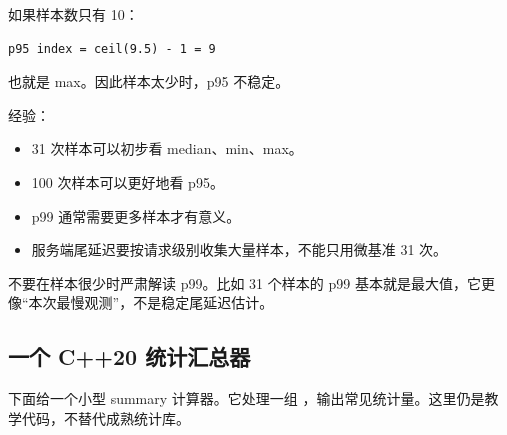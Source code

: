 如果样本数只有 10：

\begin{lstlisting}
p95 index = ceil(9.5) - 1 = 9
\end{lstlisting}

也就是 max。因此样本太少时，p95 不稳定。

经验：

\begin{itemize}
  \item 31 次样本可以初步看 median、min、max。
  \item 100 次样本可以更好地看 p95。
  \item p99 通常需要更多样本才有意义。
  \item 服务端尾延迟要按请求级别收集大量样本，不能只用微基准 31 次。
\end{itemize}

\begin{warningbox}
不要在样本很少时严肃解读 p99。比如 31 个样本的 p99 基本就是最大值，它更像“本次最慢观测”，不是稳定尾延迟估计。
\end{warningbox}

\subsection{一个 C++20 统计汇总器}

下面给一个小型 summary 计算器。它处理一组 ，输出常见统计量。这里仍是教学代码，不替代成熟统计库。

